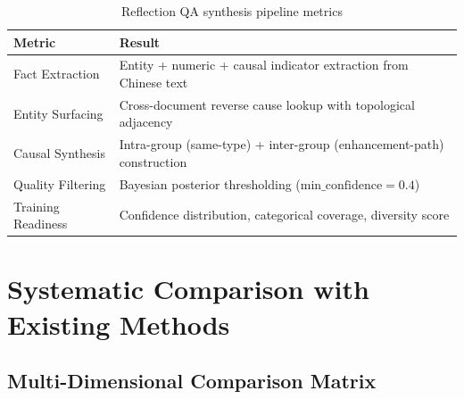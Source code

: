 \documentclass[11pt,a4paper]{article}
\begin{document}
\begin{table}[H]
\centering
\caption{Reflection QA synthesis pipeline metrics}
\label{tab:reflection}
\begin{tabular}{ll}
\toprule
\textbf{Metric} & \textbf{Result} \\
\midrule
Fact Extraction      & Entity + numeric + causal indicator extraction from Chinese text \\
Entity Surfacing     & Cross-document reverse cause lookup with topological adjacency \\
Causal Synthesis     & Intra-group (same-type) + inter-group (enhancement-path) construction \\
Quality Filtering    & Bayesian posterior thresholding (\(\text{min\_confidence} = 0.4\)) \\
Training Readiness   & Confidence distribution, categorical coverage, diversity score \\
\bottomrule
\end{tabular}
\end{table}

\section{Systematic Comparison with Existing Methods}
\label{sec:comparison}

\subsection{Multi-Dimensional Comparison Matrix}
\end{document}
